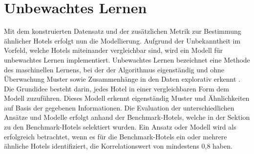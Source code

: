 \chapter{Unbewachtes Lernen}
\label{subsec:un_lear}
Mit dem konstruierten Datensatz und der zusätzlichen Metrik zur Bestimmung ähnlicher Hotels erfolgt nun die Modellierung. Aufgrund der Unbekanntheit im Vorfeld, welche Hotels miteinander vergleichbar sind, wird ein Modell für unbewachtes Lernen implementiert. Unbewachtes Lernen bezeichnet eine Methode des maschinellen Lernens, bei der der Algorithmus eigenständig und ohne Überwachung Muster sowie Zusammenhänge in den Daten explorativ erkennt \cite{datasolutGmbH.05.02.2024}. Die Grundidee besteht darin, jedes Hotel in einer vergleichbaren Form dem Modell zuzuführen. Dieses Modell erkennt eigenständig Muster und Ähnlichkeiten auf Basis der gegebenen Informationen.
\newline
\newline
Die Evaluation der unterschiedlichen Ansätze und Modelle erfolgt anhand der Benchmark-Hotels, welche in der Sektion zu den Benchmark-Hotels selektiert wurden. Ein Ansatz oder Modell wird als erfolgreich betrachtet, wenn es für die Benchmark-Hotels ein oder mehrere ähnliche Hotels identifiziert, die Korrelationswert von mindestens 0,8 haben.




